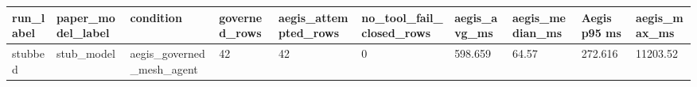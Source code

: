 \begin{tabular}{llllllllll}
 \hline
run\_label & paper\_model\_label & condition & governed\_rows & aegis\_attempted\_rows & no\_tool\_fail\_closed\_rows & aegis\_avg\_ms & aegis\_median\_ms & Aegis p95 ms & aegis\_max\_ms \\
 \hline
stubbed & stub\_model & aegis\_governed\_mesh\_agent & 42 & 42 & 0 & 598.659 & 64.57 & 272.616 & 11203.52 \\
 \hline
\end{tabular}
